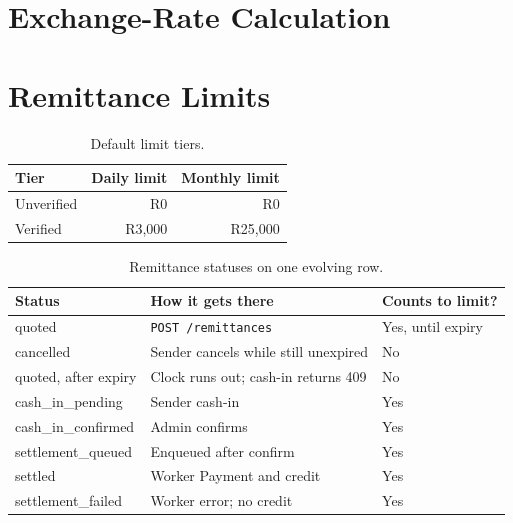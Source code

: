 \documentclass[11pt,a4paper]{article}
\newcommand{\code}[1]{\texttt{\small #1}}
\begin{document}

\section{Exchange-Rate Calculation}\label{sec:fx}

\section{Remittance Limits}\label{sec:limits}

\begin{table}[H]
\centering\small
{}
\begin{tabular}{@{}lrr@{}}
\toprule
\rowcolor{headbg}\textbf{Tier} & \textbf{Daily limit} & \textbf{Monthly limit} \\
\midrule
Unverified & R0     & R0 \\
Verified   & R3,000 & R25,000 \\
\bottomrule
\end{tabular}
\caption{Default limit tiers.}
\label{tab:tiers}
\end{table}


\begin{table}[H]
\centering\small
{}
\begin{tabular}{@{}>{\ttfamily}l l l@{}}
\toprule
\rowcolor{headbg}\textbf{Status} & \textbf{How it gets there} & \textbf{Counts to limit?} \\
\midrule
quoted             & \code{POST /remittances}                     & Yes, until expiry \\
cancelled          & Sender cancels while still unexpired          & No \\
quoted, after expiry & Clock runs out; cash-in returns 409         & No \\
cash\_in\_pending  & Sender cash-in                                & Yes \\
cash\_in\_confirmed & Admin confirms                               & Yes \\
settlement\_queued & Enqueued after confirm                        & Yes \\
settled            & Worker Payment and credit                     & Yes \\
settlement\_failed & Worker error; no credit                       & Yes \\
\bottomrule
\end{tabular}
\caption{Remittance statuses on one evolving row.}
\label{tab:statuses}
\end{table}
\end{document}
